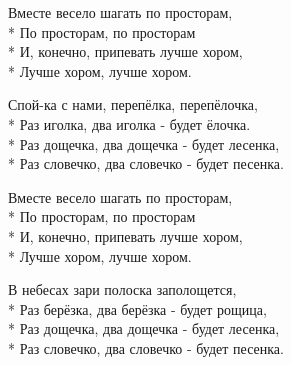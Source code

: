 \medskip

\begin{minipage}{\linewidth}
\hspace*{1.5em}Вместе весело шагать по просторам,\\*
\hspace*{1.5em}По просторам, по просторам\\*
\hspace*{1.5em}И, конечно, припевать лучше хором,\\*
\hspace*{1.5em}Лучше хором, лучше хором.\\
\end{minipage}\par\medskip\nobreak

\medskip

\begin{minipage}{\linewidth}
Спой-ка с нами, перепёлка, перепёлочка,\\*
Раз иголка, два иголка - будет ёлочка.\\*
Раз дощечка, два дощечка - будет лесенка,\\*
Раз словечко, два словечко - будет песенка.\\
\end{minipage}\par\medskip\nobreak

\medskip

\begin{minipage}{\linewidth}
\hspace*{1.5em}Вместе весело шагать по просторам,\\*
\hspace*{1.5em}По просторам, по просторам\\*
\hspace*{1.5em}И, конечно, припевать лучше хором,\\*
\hspace*{1.5em}Лучше хором, лучше хором.\\
\end{minipage}\par\medskip\nobreak

\medskip

\begin{minipage}{\linewidth}
В небесах зари полоска заполощется,\\*
Раз берёзка, два берёзка - будет рощица,\\*
Раз дощечка, два дощечка - будет лесенка,\\*
Раз словечко, два словечко - будет песенка.\\
\end{minipage}\par\medskip\nobreak

